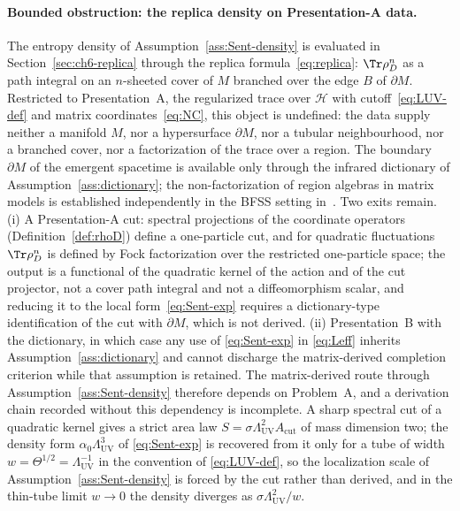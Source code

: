 \paragraph{Bounded obstruction: the replica density on Presentation-A data.}
The entropy density of Assumption~\ref{ass:Sent-density} is evaluated in
Section~\ref{sec:ch6-replica} through the replica formula~\eqref{eq:replica}:
\(\Tr\rho_D^n\) as a path integral on an \(n\)-sheeted cover of \(M\) branched
over the edge \(B\) of \(\partial M\). Restricted to Presentation~A, the
regularized trace over \(\mathcal H\) with cutoff~\eqref{eq:LUV-def} and matrix
coordinates~\eqref{eq:NC}, this object is undefined: the data supply neither a
manifold \(M\), nor a hypersurface \(\partial M\), nor a tubular neighbourhood,
nor a branched cover, nor a factorization of the trace over a region. The
boundary \(\partial M\) of the emergent spacetime is available only through the
infrared dictionary of Assumption~\ref{ass:dictionary}; the non-factorization
of region algebras in matrix models is established independently in the BFSS
setting in~\cite{Anous2020}. Two exits remain. (i) A Presentation-A cut:
spectral projections of the coordinate operators (Definition~\ref{def:rhoD})
define a one-particle cut, and for quadratic fluctuations \(\Tr\rho_D^n\) is
defined by Fock factorization over the restricted one-particle space; the
output is a functional of the quadratic kernel of the action and of the cut
projector, not a cover path integral and not a diffeomorphism scalar, and
reducing it to the local form~\eqref{eq:Sent-exp} requires a dictionary-type
identification of the cut with \(\partial M\), which is not derived.
(ii) Presentation~B with the dictionary, in which case any use of
\eqref{eq:Sent-exp} in \eqref{eq:Leff} inherits Assumption~\ref{ass:dictionary}
and cannot discharge the matrix-derived completion criterion while that
assumption is retained. The matrix-derived route through
Assumption~\ref{ass:Sent-density} therefore depends on Problem~A, and a
derivation chain recorded without this dependency is incomplete. A sharp
spectral cut of a quadratic kernel gives a strict area law
\(S=\sigma\Lambda_{\mathrm{UV}}^2 A_{\mathrm{cut}}\) of mass dimension two;
the density form \(\alpha_0\Lambda_{\mathrm{UV}}^3\) of \eqref{eq:Sent-exp} is
recovered from it only for a tube of width \(w=\Theta^{1/2}=\Lambda_{\mathrm{UV}}^{-1}\)
in the convention of \eqref{eq:LUV-def}, so the localization scale of
Assumption~\ref{ass:Sent-density} is forced by the cut rather than derived, and
in the thin-tube limit \(w\to0\) the density diverges as
\(\sigma\Lambda_{\mathrm{UV}}^2/w\).

